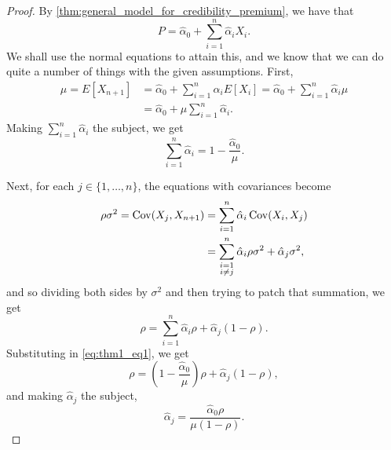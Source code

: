 \documentclass[notoc,notitlepage]{tufte-book}
\begin{document}
\begin{proof}
  By \cref{thm:general_model_for_credibility_premium}, we have that
  \begin{equation*}
    P = \hat{\alpha}_0 + \sum_{i=1}^{n} \hat{\alpha}_i X_i.
  \end{equation*}
  We shall use the normal equations to attain this, and we know that we can do
  quite a number of things with the given assumptions. First,
  \begin{align*}
    \mu = E[X_{n+1}] &= \hat{\alpha}_0 + \sum_{i=1}^{n} \hat{\alpha}_i E[X_i]
                      = \hat{\alpha}_0 + \sum_{i=1}^{n} \hat{\alpha}_i \mu \\
                     &= \hat{\alpha}_0 + \mu \sum_{i=1}^{n} \hat{\alpha}_i.
  \end{align*}
  Making $\sum_{i=1}^{n} \hat{\alpha}_i$ the subject, we get
  \begin{equation}\label{eq:thm1_eq1}
    \sum_{i=1}^{n} \hat{\alpha}_i = 1 - \frac{\hat{\alpha}_0}{\mu}.
  \end{equation}

  Next, for each $j \in \{ 1, \ldots, n \}$, the equations with covariances
  become
  \begin{align*}
    \rho \sigma^2 = \operatorname{Cov}(X_j, X_{n+1})
                  &= \sum_{i=1}^{n} \hat{\alpha}_i \operatorname{Cov}(X_i, X_j) \\
                  &= \sum_{\substack{i=1 \\ i \neq j}}^{n} \hat{\alpha}_i \rho
                    \sigma^2 + \hat{\alpha}_j \sigma^2,
  \end{align*}
  and so dividing both sides by $\sigma^2$ and then trying to patch that
  summation, we get
  \begin{equation*}
    \rho = \sum_{i=1}^{n} \hat{\alpha}_i \rho + \hat{\alpha}_j ( 1 - \rho ).
  \end{equation*}
  Substituting in \cref{eq:thm1_eq1}, we get
  \begin{equation*}
    \rho = \left( 1 - \frac{\hat{\alpha}_0}{\mu} \right) \rho + \hat{\alpha}_j
    (1 - \rho),
  \end{equation*}
  and making $\hat{\alpha}_j$ the subject,
  \begin{equation*}
    \hat{\alpha}_j = \frac{\hat{\alpha}_0 \rho}{\mu (1 - \rho)}.
  \end{equation*}


\end{proof}
\end{document}
